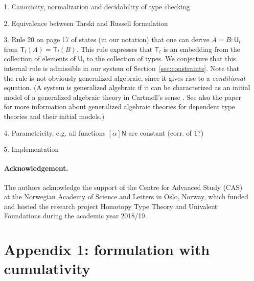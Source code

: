 \documentclass[11pt,a4paper]{article}
\theoremstyle{definition}
\newcommand{\NN}{\mathsf{N}}
\newcommand{\UU}{\mathsf{U}}
\newcommand{\T}{\mathsf{T}}
\begin{document}
1. Canonicity, normalization and decidability of type checking

2. Equivalence between Tarski and Russell formulation

3. Rule 20 on page 17 of \cite{VV} states (in our notation) that
one can derive $A = B : \UU_l$ from $\T_l(A) = \T_l(B)$.
This rule expresses that $\T_l$ is an embedding from the collection 
of elements of $\UU_l$ to the collection of types. 
We conjecture that this internal rule is admissible
in our system of Section~\ref{sec:constraints}.
Note that the rule is not obviously generalized algebraic, 
since it gives rise to a \emph{conditional} equation. 
 (A system is generalized algebraic if it can be characterized as an initial model of a generalized algebraic theory in Cartmell's sense \cite{cartmell:apal}.
 See also the paper \cite{bezem:hofmann} for more information about 
generalized algebraic theories for dependent type theories and their initial models.)

4. Parametricity, e.g. all functions $[\alpha]\NN$ are constant (corr. of 1?)

5. Implementation

\paragraph{Acknowledgement.}
The authors acknowledge the support of the Centre for Advanced Study (CAS)
at the Norwegian Academy of Science and Letters
in Oslo, Norway, which funded and hosted the research project Homotopy
Type Theory and Univalent Foundations during the academic year 2018/19.




\newpage

\section*{Appendix 1: formulation with cumulativity}

\end{document}
